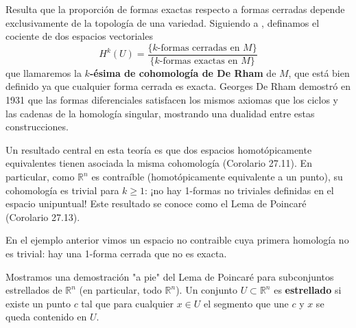 \documentclass[spanish]{book}
\theoremstyle{definition}
\newcommand{\R}{\mathbb{R}}
\begin{document}
	Resulta que la proporción de formas exactas respecto a formas cerradas depende exclusivamente de la topología de una variedad. Siguiendo a \cite{Loring}, definamos el cociente de dos espacios vectoriales
	\[H^k(U)=\frac{\{k\text{-formas cerradas en }M\}}{\{k\text{-formas exactas en }M\}}\]
	que llamaremos la \textbf{$k$-ésima de cohomología de De Rham} de $M$, que está bien definido ya que cualquier forma cerrada es exacta. Georges De Rham demostró en 1931 que las formas diferenciales satisfacen los mismos axiomas que los ciclos y las cadenas de la homología singular, mostrando una dualidad entre estas construcciones.
	
	Un resultado central en esta teoría es que dos espacios homotópicamente equivalentes tienen asociada la misma cohomología (Corolario 27.11). En particular, como $\R^n$ es contraíble (homotópicamente equivalente a un punto), su cohomología es trivial para $k\geq1$: ¡no hay 1-formas no triviales definidas en el espacio unipuntual! Este resultado se conoce como el Lema de Poincaré (Corolario 27.13).
	
	En el ejemplo anterior vimos un espacio no contraible cuya primera homología no es trivial: hay una 1-forma cerrada que no es exacta.
	
	Mostramos una demostración "a pie" del Lema de Poincaré para subconjuntos estrellados de $\R^n$ (en particular, todo $\R^n$). Un conjunto $U\subset \R^n$ es \textbf{estrellado} si existe un punto $c$ tal que para cualquier $x\in U$ el segmento que une $c$ y $x$ se queda contenido en $U$.
	
\end{document}
